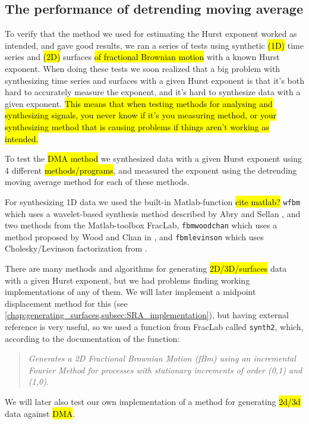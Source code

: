 
\subsection{The performance of detrending moving average}
To verify that the method we used for estimating the Hurst exponent worked as intended, and gave good results, we ran a series of tests using synthetic \hl{(1D)} time series and \hl{(2D)} surfaces \hl{of fractional Brownian motion} with a known Hurst exponent. When doing these tests we soon realized that a big problem with synthesizing time series and surfaces with a given Hurst exponent is that it's both hard to accurately measure the exponent, and it's hard to synthesize data with a given exponent. \hl{This means that when testing methods for analysing and synthesizing signals, you never know if it's you measuring method, or your synthesizing method that is causing problems if things aren't working as intended.}

To test the \hl{DMA method} we synthesized data with a given Hurst exponent using 4 different \hl{methods/programs}, and measured the exponent using the detrending moving average method for each of these methods. 

For synthesizing 1D data we used the built-in Matlab-function \hl{cite matlab?} \Verb!wfbm! which uses a wavelet-based synthesis method described by Abry and Sellan \cite{abry1996wavelet}, and two methods from the Matlab-toolbox FracLab\cite{fraclab_toolbox}, \Verb!fbmwoodchan! which uses a method proposed by Wood and Chan in \cite{wood1994simulation}, and \Verb!fbmlevinson! which uses Cholesky/Levinson factorization from \cite{levinson1947wiener}. 

There are many methods and algorithms for generating \hl{2D/3D/surfaces} data with a given Hurst exponent, but we had problems finding working implementations of any of them. We will later implement a midpoint displacement method for this (see \cref{chap:generating_surfaces,subsec:SRA_implementation}), but having external reference is very useful, so we used a function from FracLab called \Verb!synth2!, which, according to the documentation of the function:%
\begin{quote}
    \textit{Generates a 2D Fractional Brownian Motion (fBm) using an incremental Fourier Method for processes with stationary increments of order (0,1) and (1,0).}
\end{quote}
We will later also test our own implementation of a method for generating \hl{2d/3d} data against \hl{DMA}.

